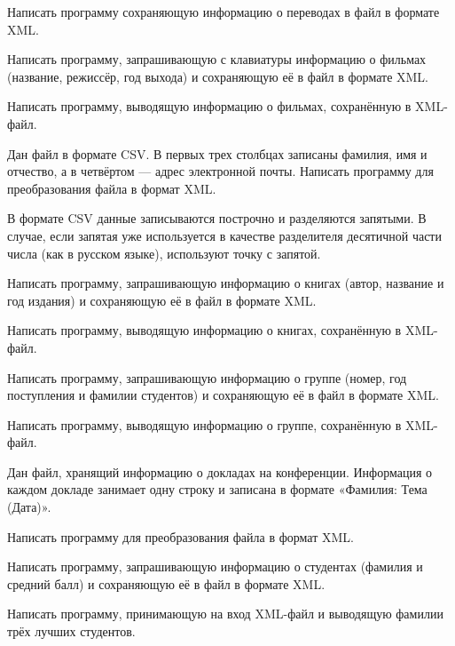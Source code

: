 Написать программу сохраняющую информацию о переводах в файл в формате
XML.

\task Написать программу, запрашивающую с клавиатуры информацию о
фильмах (название, режиссёр, год выхода) и сохраняющую её в файл в
формате XML.

Написать программу, выводящую информацию о фильмах, сохранённую в
XML-файл.

\task Дан файл в формате CSV. В первых трех столбцах записаны фамилия,
имя и отчество, а в четвёртом — адрес электронной почты. Написать
программу для преобразования файла в формат XML.

В формате CSV данные записываются построчно и разделяются запятыми. В
случае, если запятая уже используется в качестве разделителя десятичной
части числа (как в русском языке), используют точку с запятой.

\task Написать программу, запрашивающую информацию о книгах (автор,
название и год издания) и сохраняющую её в файл в формате
XML.

Написать программу, выводящую информацию о книгах, сохранённую в
XML-файл.

\task Написать программу, запрашивающую информацию о группе (номер,
год поступления и фамилии студентов) и сохраняющую её в файл в формате
XML.

Написать программу, выводящую информацию о группе, сохранённую в
XML-файл.

\task Дан файл, хранящий информацию о докладах на
конференции. Информация о каждом докладе занимает одну строку и
записана в формате «Фамилия: Тема (Дата)».

Написать программу для преобразования файла в формат XML.

\task Написать программу, запрашивающую информацию о студентах
(фамилия и средний балл) и сохраняющую её в файл в формате XML.

Написать программу, принимающую на вход XML-файл и выводящую фамилии
трёх лучших студентов.
